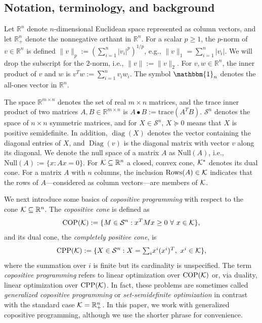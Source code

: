\documentclass[12pt]{article}
\DeclareMathOperator{\diag}{diag}
\DeclareMathOperator{\Diag}{Diag}
\newcommand{\CP}{{\mathrm{CPP}}}
\newcommand{\COP}{{\mathrm{COP}}}
\newcommand{\Null}{\mathrm{Null}}
\newcommand{\SYM}{{\mathcal{S}}}
\def\RR{{\mathbb{R}}}
\begin{document}
\begin{onehalfspace}
\subsection{Notation, terminology, and background} %

Let $\RR^n$ denote $n$-dimensional Euclidean space represented as
column vectors, and let $\RR_+^n$ denote the nonnegative orthant in
$\RR^n$. For a scalar $p \ge 1$, the $p$-norm of $v \in \RR^n$ is
defined $\|v\|_p := (\sum_{i=1}^n |v_i|^p)^{1/p}$, e.g., $\|v\|_1 =
\sum_{i=1}^n |v_i|$. We will drop the subscript for the $2$-norm, i.e.,
$\|v\| := \|v\|_2$. For $v,w \in \RR^n$, the inner product of $v$ and
$w$ is $v^Tw := \sum_{i=1}^n v_iw_i$. The symbol $\mathbbm{1}_n$ denotes
the all-ones vector in $\RR^n$.

The space $\RR^{m \times n}$ denotes the set of real $m \times n$
matrices, and the trace inner product of two matrices $A, B \in \RR^{m
\times n}$ is $A\bullet B := \text{trace}(A^TB)$. $\SYM^n$ denotes
the space of $n \times n$ symmetric matrices, and for $X \in \SYM^n$,
$X \succeq 0$ means that $X$ is positive semidefinite. In addition,
$\diag(X)$ denotes the vector containing the diagonal entries of
$X$, and $\Diag(v)$ is the diagonal matrix with vector $v$ along its
diagonal. We denote the null space of a matrix $A$ as $\Null(A)$, i.e.,
$\Null(A) := \{x : Ax =0\}$. For ${\cal K} \subseteq \RR^n$ a closed,
convex cone, ${\cal K}^*$ denotes its dual cone. For a matrix $A$ with
$n$ columns, the inclusion $\text{Rows}(A) \in {\cal K}$ indicates that
the rows of $A$---considered as column vectors---are members of ${\cal
K}$.

We next introduce some basics of {\em copositive programming} with
respect to the cone ${\cal K} \subseteq \RR^n$. The {\em
copositive cone\/} is defined as
\[
    \COP({\cal K}) := \{ M \in \SYM^n: x^T M x \ge 0 \ \forall \ x \in {\cal K} \},
\]
and its dual cone, the {\em completely positive cone\/}, is
\[
    \CP({\cal K}) := \{ X \in \SYM^n: X = \textstyle{\sum_i} x^i (x^i)^T, \ x^i \in {\cal K} \},
\]
where the summation over $i$ is finite but its cardinality is
unspecified. The term {\em copositive programming\/} refers to linear
optimization over $\COP({\cal K})$ or, via duality, linear optimization
over $\CP({\cal K})$. In fact, these problems are sometimes called
{\em generalized copositive programming\/} or {\em set-semidefinite
optimization\/} \cite{Burer.Dong.2012,Eichfelder.Jahn.2008} in contrast
with the standard case ${\cal K} = \RR_+^n$. In this paper, we work with
generalized copositive programming, although we use the shorter phrase
for convenience.


\end{onehalfspace}
\end{document}
